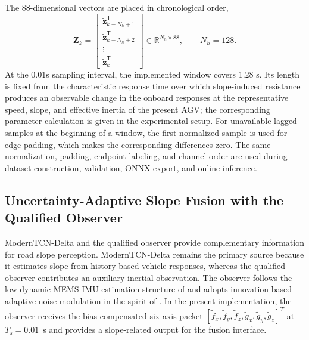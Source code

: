 \documentclass{ieeeaccess}
\newcommand{\citep}[1]{\cite{#1}}
\begin{document}
The 88-dimensional vectors are placed in chronological order,
\begin{equation}
\mathbf Z_k=
\begin{bmatrix}
\widetilde{\mathbf z}_{k-N_h+1}^{\mathsf T}\\
\widetilde{\mathbf z}_{k-N_h+2}^{\mathsf T}\\
\vdots\\
\widetilde{\mathbf z}_{k}^{\mathsf T}
\end{bmatrix}
\in\mathbb R^{N_h\times88},\qquad N_h=128.
\label{eq:historical_input_128x88}
\end{equation}
At the 0.01s sampling interval, the implemented window covers 1.28 s. Its length is fixed from the characteristic response time over which slope-induced resistance produces an observable change in the onboard responses at the representative speed, slope, and effective inertia of the present AGV; the corresponding parameter calculation is given in the experimental setup. For unavailable lagged samples at the beginning of a window, the first normalized sample is used for edge padding, which makes the corresponding differences zero. The same normalization, padding, endpoint labeling, and channel order are used during dataset construction, validation, ONNX export, and online inference.

\subsection{Uncertainty-Adaptive Slope Fusion with the Qualified Observer}
\label{sec:adaptive_slope_fusion}

ModernTCN-Delta and the qualified observer provide complementary information
for road slope perception. ModernTCN-Delta remains the primary source because
it estimates slope from history-based vehicle responses, whereas the qualified
observer contributes an auxiliary inertial observation. The observer follows
the low-dynamic MEMS-IMU estimation structure of
\citep{Chen2024RobustAttitude} and adopts innovation-based adaptive-noise
modulation in the spirit of \citep{Guo2022SageHusaAKF}. In the present
implementation, the observer receives the bias-compensated six-axis packet
$[\tilde f_x,\tilde f_y,\tilde f_z,\tilde g_x,\tilde g_y,\tilde g_z]^{T}$ at
$T_s=0.01$~s and provides a slope-related output for the fusion interface.
\end{document}
